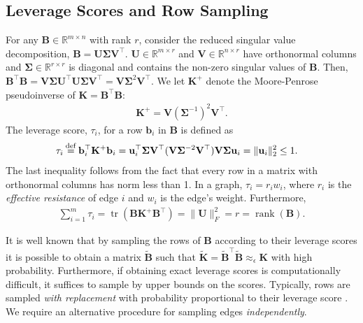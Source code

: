 \documentclass[11pt]{article}
\DeclareMathOperator*{\rank}{rank}
\DeclareMathOperator*{\tr}{tr}
\newcommand{\eqdef}{\mathbin{\stackrel{\rm def}{=}}}
\newcommand{\norm}[1]{\|#1\|}
\newcommand{\bv}[1]{\mathbf{#1}}
\begin{document}
\subsection{Leverage Scores and Row Sampling}
\label{Leverage Scores and Row Sampling}
For any $\bv{B} \in \mathbb{R}^{m \times n}$ with rank $r$, consider the reduced singular value decomposition, $\bv{B}=\bv{U}\bv{\Sigma}\bv{V}^{\top}$. $\bv{U} \in \mathbb{R}^{m\times r}$ and $\bv{V} \in \mathbb{R}^{n \times r}$ have orthonormal columns and $\bv{\Sigma} \in \mathbb{R}^{r \times r}$ is diagonal and contains the non-zero singular values of $\bv{B}$. Then, $\bv{B}^\top\bv{B} = \bv{V}\bv{\Sigma}\bv{U}^\top\bv{U}\bv{\Sigma}\bv{V}^{\top} = \bv{V}\bv{\Sigma}^2\bv{V}^{\top}$. We let $\bv{K}^+$ denote the Moore-Penrose pseudoinverse of $\bv{K} = \bv{B}^\top \bv{B}$:
\begin{align*}
\bv{K}^+ = \bv{V}(\bv{\Sigma}^{-1})^2\bv{V}^{\top}.
\end{align*}
 The leverage score, $\tau_i$, for a row $\bv{b}_i$ in $\bv{B}$ is defined as
\begin{align*}
\tau_i &\eqdef \bv{b}_i^\top \bv{K}^+ \bv{b}_i = \bv{u}_i^\top \bv{\Sigma V^\top} (\bv{V} \bv{\Sigma}^{-2} \bv{V^\top) V \Sigma} \bv{u}_i = \norm{\bv{u}_i}_2^2 \le 1.
\end{align*}
The last inequality follows from the fact that every row in a matrix with orthonormal columns has norm less than 1. In a graph, $\tau_i = r_i w_i$, where $r_i$ is the \emph{effective resistance} of edge $i$ and $w_i$ is the edge's weight. Furthermore,
\begin{align*}
\sum_{i=1}^m \tau_i = \tr(\bv{B}\bv{K^+}\bv{B^\top}) = \norm{\bv{U}}_F^2 = r = \rank(\bv{B}).
\end{align*}



It is well known that by sampling the rows of $\bv{B}$ according to their leverage scores it is possible to obtain a matrix $\bv{\tilde B}$ such that $\bv{\tilde K} = \bv{\tilde B}^\top \bv{\tilde B} \approx_\epsilon \bv{K}$ with high probability. Furthermore, if obtaining exact leverage scores is computationally difficult, it suffices to sample by upper bounds on the scores. Typically, rows are sampled \emph{with replacement} with probability proportional to their leverage score \cite{graphSparsificationEffectiveResistance,pengV2}. We require an alternative procedure for sampling edges \emph{independently}.
\end{document}
